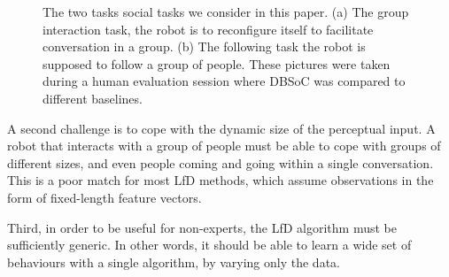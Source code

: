 \documentclass[letterpaper, 10 pt, conference]{ieeeconf}
\begin{document}
\begin{figure}[t]
\begin{subfigure}[b]{0.39\columnwidth}
    \caption{}
    \label{fig:follow}
  \end{subfigure} 
  \caption{The two tasks social tasks we consider in this paper. (a) The group interaction task, the robot is to reconfigure itself to facilitate conversation in a group. (b) The following task the robot is supposed to follow a group of people. These pictures were taken during a human evaluation session where DBSoC was compared to different baselines. }

  \vspace{-7mm}

  \label{fig:behaviors}
  \end{figure}

A second challenge is to cope with the dynamic size of the perceptual input.  A robot that interacts with a group of people must be able to cope with groups of different sizes, and even people coming and going within a single conversation.  This is a poor match for most LfD methods, which assume observations in the form of fixed-length feature vectors.

Third, in order to be useful for non-experts, the LfD algorithm must be sufficiently generic. In other words, it should be able to learn a wide set of behaviours with a single algorithm, by varying only the data. 


\end{document}

